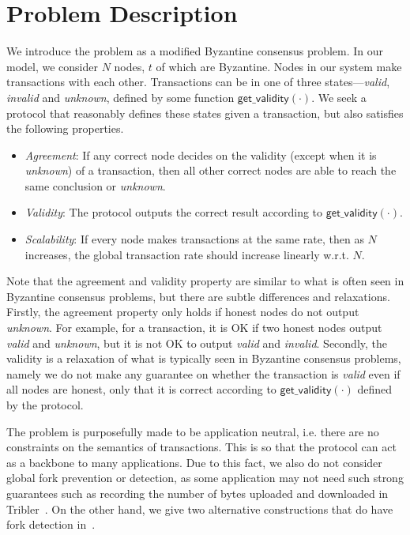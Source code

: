 \section{Problem Description}
\label{sec:description}
We introduce the problem as a modified Byzantine consensus problem.
In our model, we consider $N$ nodes, $t$ of which are Byzantine.
Nodes in our system make transactions with each other.
Transactions can be in one of three states---\emph{valid}, \emph{invalid} and \emph{unknown}, defined by some function $\textsf{get\_validity}(\cdot)$.
We seek a protocol that reasonably defines these states given a transaction,
but also satisfies the following properties.
\begin{itemize}
    \item \emph{Agreement}:
        If any correct node decides on the validity (except when it is \emph{unknown}) of a transaction,
        then all other correct nodes are able to reach the same conclusion or \emph{unknown}.
    \item \emph{Validity}:
        The protocol outputs the correct result according to $\textsf{get\_validity}(\cdot).$
    \item \emph{Scalability}:
        If every node makes transactions at the same rate,
        then as $N$ increases,
        the global transaction rate should increase linearly w.r.t. $N$.
\end{itemize}

Note that the agreement and validity property are similar to what is often seen in Byzantine consensus problems,
but there are subtle differences and relaxations.
Firstly, the agreement property only holds if honest nodes do not output \emph{unknown}.
For example, for a transaction, it is OK if two honest nodes output \emph{valid} and \emph{unknown}, but it is not OK to output \emph{valid} and \emph{invalid}.
Secondly, the validity is a relaxation of what is typically seen in Byzantine consensus problems,
namely we do not make any guarantee on whether the transaction is \emph{valid} even if all nodes are honest,
only that it is correct according to $\textsf{get\_validity}(\cdot)$ defined by the protocol.

The problem is purposefully made to be application neutral,
i.e. there are no constraints on the semantics of transactions.
This is so that the protocol can act as a backbone to many applications.
Due to this fact, we also do not consider global fork prevention or detection,
as some application may not need such strong guarantees such as recording the number of bytes uploaded and downloaded in Tribler~\cite{pimotte, pouwelse2008tribler}.
On the other hand, we give two alternative constructions that do have fork detection in~.

